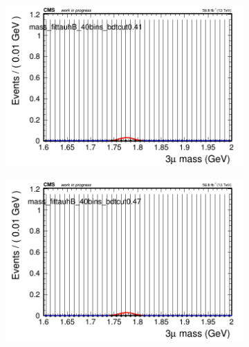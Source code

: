 \begin{figure}[H]
\begin{subfigure}{0.2\textwidth}
        \caption{}
    \end{subfigure}
    \begin{subfigure}{0.2\textwidth}
        \includegraphics[width=\textwidth]{power_law/plots/tauhB/massfit_tauhB_40bins_bdtcut0.41.png}
        \caption{}
    \end{subfigure}
    \begin{subfigure}{0.2\textwidth}
        \includegraphics[width=\textwidth]{power_law/plots/tauhB/massfit_tauhB_40bins_bdtcut0.47.png}
        \caption{}
    \end{subfigure}
    \begin{subfigure}{0.2\textwidth}

\end{subfigure}
\end{figure}
